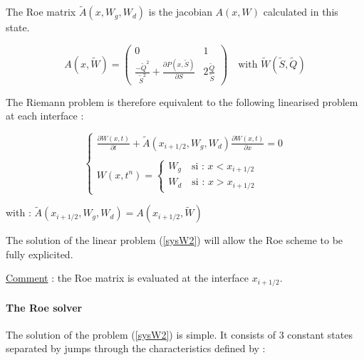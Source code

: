 \vspace{0.5cm}

The Roe matrix $\tilde A (x,W_g,W_d)$ is the jacobian $A(x,W)$ calculated in this state.

\begin{equation}
 A(x,\tilde W) = \left ( \begin{array}{cc}
       0 & 1 \\
       \frac{-\tilde{Q}^2}{\tilde{S}^2} + \frac{\partial P(x,\tilde S )}{\partial S} & 2 \frac{\tilde Q}{\tilde S}
    \end{array} \right ) \quad \mbox{with } \tilde W (\tilde S , \tilde Q)
\end{equation}

\vspace{0.5cm}

The Riemann problem is therefore equivalent to the following linearised problem at each interface :

\begin{equation}
 \label{sysW2}
 \left \lbrace
  \begin{array}{l}
   \frac{\partial W(x,t)}{\partial t} + \tilde A(x_{i+1/2},W_g,W_d) \frac{\partial W(x,t)}{\partial x} = 0 \\
   \\
   W(x,t^n) = \left \lbrace
             \begin{array}{l}
               W_{g} \quad \mbox{si : } x < x_{i+1/2} \\
               W_{d} \quad \mbox{si : } x > x_{i+1/2}
             \end{array}
             \right.
  \end{array}
 \right.
\end{equation}

with : $\tilde A(x_{i+1/2},W_g,W_d) = A(x_{i+1/2},\tilde W)$

The solution of the linear problem (\ref{sysW2}) will allow the Roe scheme to be fully explicited. 

\underline{Comment} : the Roe matrix is evaluated at the interface $x_{i+1/2}$.

\paragraph{The Roe solver\\}

\hspace*{1cm}

The solution of the problem (\ref{sysW2}) is simple. It consists of 3 constant states separated by jumps through the characteristics defined by :

